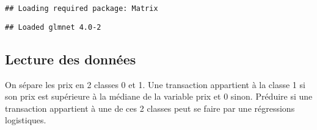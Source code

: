\documentclass[
]{article}
\newenvironment{Shaded}{\begin{snugshade}}{\end{snugshade}}
\newcommand{\CommentTok}[1]{\textcolor[rgb]{0.56,0.35,0.01}{\textit{#1}}}
\newcommand{\DataTypeTok}[1]{\textcolor[rgb]{0.13,0.29,0.53}{#1}}
\newcommand{\DecValTok}[1]{\textcolor[rgb]{0.00,0.00,0.81}{#1}}
\newcommand{\KeywordTok}[1]{\textcolor[rgb]{0.13,0.29,0.53}{\textbf{#1}}}
\newcommand{\NormalTok}[1]{#1}
\newcommand{\OperatorTok}[1]{\textcolor[rgb]{0.81,0.36,0.00}{\textbf{#1}}}
\newcommand{\OtherTok}[1]{\textcolor[rgb]{0.56,0.35,0.01}{#1}}
\newcommand{\StringTok}[1]{\textcolor[rgb]{0.31,0.60,0.02}{#1}}
\begin{document}
\begin{verbatim}
## Loading required package: Matrix
\end{verbatim}

\begin{verbatim}
## Loaded glmnet 4.0-2
\end{verbatim}

\hypertarget{lecture-des-donnuxe9es}{%
\subsection{Lecture des données}\label{lecture-des-donnuxe9es}}

On sépare les prix en 2 classes 0 et 1. Une transaction appartient à la
classe 1 si son prix est supérieure à la médiane de la variable prix et
0 sinon. Préduire si une transaction appartient à une de ces 2 classes
peut se faire par une régressions logistiques.

\begin{Shaded}
\end{Shaded}
\end{document}
